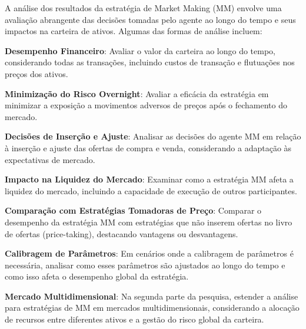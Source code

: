 
A análise dos resultados da estratégia de Market Making (MM) envolve uma avaliação abrangente das decisões tomadas pelo agente ao longo do tempo e seus impactos na carteira de ativos. Algumas das formas de análise incluem:

\textbf{Desempenho Financeiro}: Avaliar o valor da carteira ao longo do tempo, considerando todas as transações, incluindo custos de transação e flutuações nos preços dos ativos.

\textbf{Minimização do Risco Overnight}: Avaliar a eficácia da estratégia em minimizar a exposição a movimentos adversos de preços após o fechamento do mercado.

\textbf{Decisões de Inserção e Ajuste}: Analisar as decisões do agente MM em relação à inserção e ajuste das ofertas de compra e venda, considerando a adaptação às expectativas de mercado.

\textbf{Impacto na Liquidez do Mercado}: Examinar como a estratégia MM afeta a liquidez do mercado, incluindo a capacidade de execução de outros participantes.

\textbf{Comparação com Estratégias Tomadoras de Preço}: Comparar o desempenho da estratégia MM com estratégias que não inserem ofertas no livro de ofertas (price-taking), destacando vantagens ou desvantagens.

\textbf{Calibragem de Parâmetros}: Em cenários onde a calibragem de parâmetros é necessária, analisar como esses parâmetros são ajustados ao longo do tempo e como isso afeta o desempenho global da estratégia.

\textbf{Mercado Multidimensional}: Na segunda parte da pesquisa, estender a análise para estratégias de MM em mercados multidimensionais, considerando a alocação de recursos entre diferentes ativos e a gestão do risco global da carteira.
